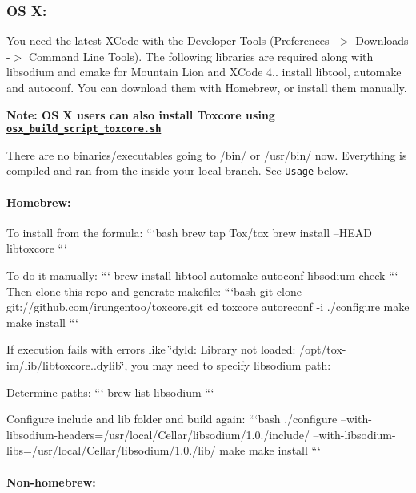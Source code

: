 \label{_osx}%
 \subsubsection*{O\+S X\+:}

You need the latest X\+Code with the Developer Tools (Preferences -\/$>$ Downloads -\/$>$ Command Line Tools). The following libraries are required along with libsodium and cmake for Mountain Lion and X\+Code 4.. install libtool, automake and autoconf. You can download them with Homebrew, or install them manually.

{\bfseries Note\+: O\+S X users can also install Toxcore using \href{other/osx_build_script_toxcore.sh}{\tt osx\+\_\+build\+\_\+script\+\_\+toxcore.\+sh}}

There are no binaries/executables going to /bin/ or /usr/bin/ now. Everything is compiled and ran from the inside your local branch. See \href{#usage}{\tt Usage} below. \label{_homebrew}%
 \paragraph*{Homebrew\+:}

To install from the formula\+: ```bash brew tap Tox/tox brew install --H\+E\+A\+D libtoxcore ```

To do it manually\+: ``` brew install libtool automake autoconf libsodium check ``` Then clone this repo and generate makefile\+: ```bash git clone git\+://github.com/irungentoo/toxcore.\+git cd toxcore autoreconf -\/i ./configure make make install ```

If execution fails with errors like \char`\"{}dyld\+: Library not loaded\+: /opt/tox-\/im/lib/libtoxcore..\+dylib\char`\"{}, you may need to specify libsodium path\+:

Determine paths\+: ``` brew list libsodium ```

Configure include and lib folder and build again\+: ```bash ./configure --with-\/libsodium-\/headers=/usr/local/\+Cellar/libsodium/1.0./include/ --with-\/libsodium-\/libs=/usr/local/\+Cellar/libsodium/1.0./lib/ make make install ```

\label{_non-homebrew}%
 \paragraph*{Non-\/homebrew\+:}

